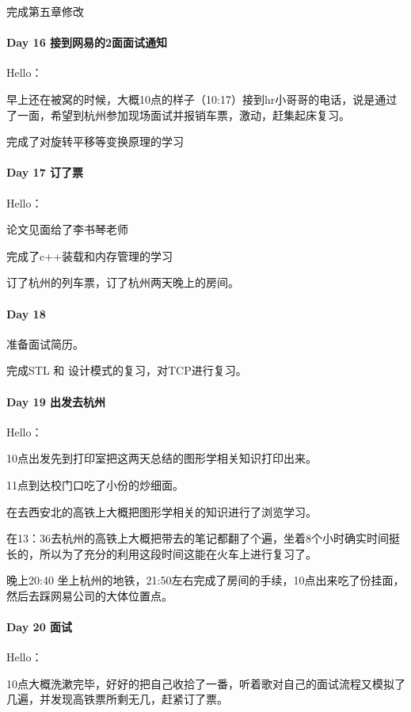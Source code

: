 \documentclass[UTF8,a4paper,8pt]{ctexart}
\begin{document}
	 	 完成第五章修改
	 	 
 	 \paragraph{Day 16  接到网易的2面面试通知    \quad     }
	 	 Hello：
	 	 
	 	 早上还在被窝的时候，大概10点的样子（10:17）接到hr小哥哥的电话，说是通过了一面，希望到杭州参加现场面试并报销车票，激动，赶集起床复习。
	 	 
	 	 完成了对旋转平移等变换原理的学习
	 	 
 	 \paragraph{Day 17  订了票    \quad     }
	 	 Hello：
	 	 
	 	 论文见面给了李书琴老师
	 	 
	 	 完成了c++装载和内存管理的学习
	 	 
	 	 订了杭州的列车票，订了杭州两天晚上的房间。
	 	 
 	 \paragraph{Day 18      \quad     }
	 	 准备面试简历。
	 	 
	 	 完成STL 和 设计模式的复习，对TCP进行复习。
	 	 
 	 \paragraph{Day 19  出发去杭州    \quad     }
		 Hello：
		 
		 10点出发先到打印室把这两天总结的图形学相关知识打印出来。
		 
		 11点到达校门口吃了小份的炒细面。
		 
		 在去西安北的高铁上大概把图形学相关的知识进行了浏览学习。
		 
		 在13：36去杭州的高铁上大概把带去的笔记都翻了个遍，坐着8个小时确实时间挺长的，所以为了充分的利用这段时间这能在火车上进行复习了。
		 
		 晚上20:40 坐上杭州的地铁，21:50左右完成了房间的手续，10点出来吃了份挂面，然后去踩网易公司的大体位置点。
 	 \paragraph{Day 20  面试    \quad     }
	 	 Hello：
	 	 
	 	 10点大概洗漱完毕，好好的把自己收拾了一番，听着歌对自己的面试流程又模拟了几遍，并发现高铁票所剩无几，赶紧订了票。
	 	 
\end{document}
